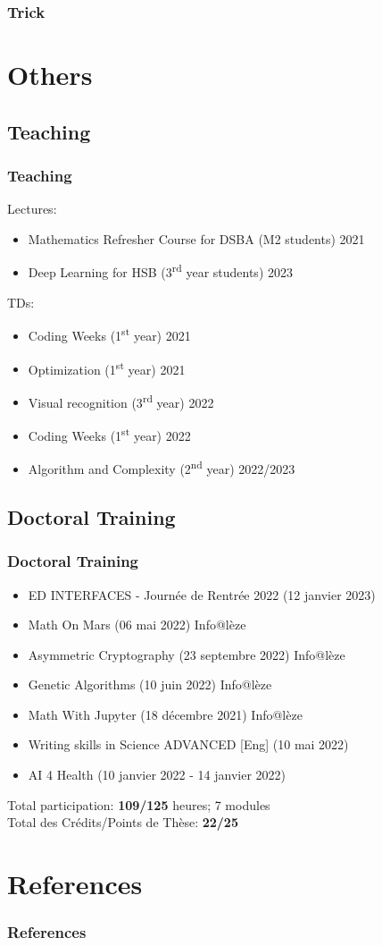 \documentclass{beamer}
\begin{document}
	\subsubsection{Trick}
	
	\section{Others}
	\subsection{Teaching}
	\begin{frame}
		\frametitle{Teaching}
		Lectures:
		\begin{itemize}
			\item Mathematics Refresher Course for DSBA (M2 students) 2021
			\item Deep Learning for HSB (3\textsuperscript{rd} year students) 2023
		\end{itemize}
		\vspace{0.5cm}
		TDs:
		\begin{itemize}
			\item Coding Weeks (1\textsuperscript{st} year) 2021
			\item Optimization (1\textsuperscript{st} year) 2021
			\item Visual recognition (3\textsuperscript{rd} year) 2022
			\item Coding Weeks (1\textsuperscript{st} year) 2022
			\item Algorithm and Complexity (2\textsuperscript{nd} year) 2022/2023
		\end{itemize}
	\end{frame}
	
	\subsection{Doctoral Training}
	\begin{frame}
		\frametitle{Doctoral Training}
		\begin{itemize}
			\item ED INTERFACES - Journée de Rentrée 2022 (12 janvier 2023)
			\item Math On Mars (06 mai 2022) Info@lèze
			\item Asymmetric Cryptography (23 septembre 2022) Info@lèze
			\item Genetic Algorithms (10 juin 2022) Info@lèze
			\item Math With Jupyter (18 décembre 2021) Info@lèze
			\item Writing skills in Science ADVANCED [Eng] (10 mai 2022)
			\item AI 4 Health (10 janvier 2022 - 14 janvier 2022)
		\end{itemize}
		\vspace{0.5cm}
		Total participation: \textbf{109/125} heures; 7 modules\\
		Total des Crédits/Points de Thèse: \textbf{22/25}
	\end{frame}
	
	\section{References}
	\begin{frame}[allowframebreaks]
		\frametitle{References}
		\nocite{*}
		
		
	\end{frame}
\end{document}
